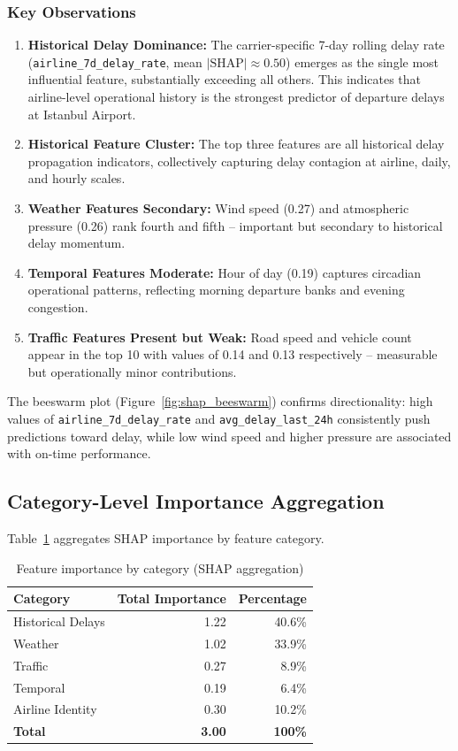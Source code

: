 \documentclass{report}
\begin{document}
\subsubsection*{Key Observations}

\begin{enumerate}
\item \textbf{Historical Delay Dominance:} The carrier-specific 7-day
  rolling delay rate (\texttt{airline\_7d\_delay\_rate},
  mean $|\text{SHAP}| \approx 0.50$) emerges as the single most
  influential feature, substantially exceeding all others.  This indicates
  that airline-level operational history is the strongest predictor of
  departure delays at Istanbul Airport.
\item \textbf{Historical Feature Cluster:} The top three features are all
  historical delay propagation indicators, collectively capturing delay
  contagion at airline, daily, and hourly scales.
\item \textbf{Weather Features Secondary:} Wind speed (0.27) and atmospheric
  pressure (0.26) rank fourth and fifth -- important but secondary to
  historical delay momentum.
\item \textbf{Temporal Features Moderate:} Hour of day (0.19) captures
  circadian operational patterns, reflecting morning departure banks and
  evening congestion.
\item \textbf{Traffic Features Present but Weak:} Road speed and vehicle
  count appear in the top 10 with values of 0.14 and 0.13 respectively --
  measurable but operationally minor contributions.
\end{enumerate}

The beeswarm plot (Figure~\ref{fig:shap_beeswarm}) confirms directionality:
high values of \texttt{airline\_7d\_delay\_rate} and
\texttt{avg\_delay\_last\_24h} consistently push predictions toward delay,
while low wind speed and higher pressure are associated with on-time
performance.

\subsection{Category-Level Importance Aggregation}

Table~\ref{tab:shap_cat} aggregates SHAP importance by feature category.

\begin{table}[H]
\centering
\caption{Feature importance by category (SHAP aggregation)}
\label{tab:shap_cat}
\begin{tabular}{lrr}
\toprule
\textbf{Category} & \textbf{Total Importance} & \textbf{Percentage} \\
\midrule
Historical Delays  & 1.22 & 40.6\% \\
Weather            & 1.02 & 33.9\% \\
Traffic            & 0.27 & 8.9\%  \\
Temporal           & 0.19 & 6.4\%  \\
Airline Identity   & 0.30 & 10.2\% \\
\textbf{Total}     & \textbf{3.00} & \textbf{100\%} \\
\bottomrule
\end{tabular}
\end{table}
\end{document}

